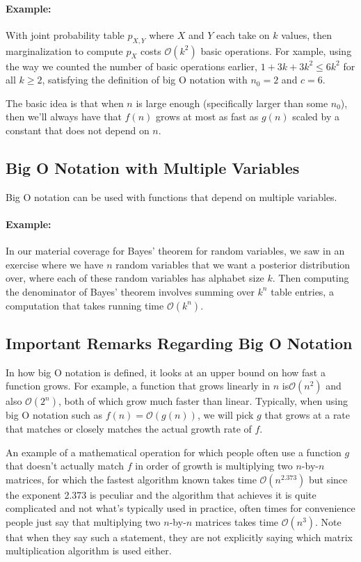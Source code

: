 \documentclass[6008notes.tex]{subfiles}
\begin{document}
\paragraph{Example:} With joint probability table $p_{X,Y}$ where $X$ and $Y$ each take on $k$ values, then marginalization to compute $p_X$ costs $\mathcal{O}(k^2)$ basic operations. For xample, using the way we counted the number of basic operations earlier, $1+3k+3k^2 \le 6k^2$ for all $k \ge 2$, satisfying the definition of big O notation with $n_0=2$ and $c=6$.

The basic idea is that when $n$ is large enough (specifically larger than some $n_0$), then we'll always have that $f(n)$ grows at most as fast as $g(n)$ scaled by a constant that does not depend on $n$.

\subsection{Big O Notation with Multiple Variables}

Big O notation can be used with functions that depend on multiple variables.

\paragraph{Example:} In our material coverage for Bayes' theorem for random variables, we saw in an exercise where we have $n$ random variables that we want a posterior distribution over, where each of these random variables has alphabet size $k$. Then computing the denominator of Bayes' theorem involves summing over $k^n$ table entries, a computation that takes running time $\mathcal{O}(k^ n)$.

\subsection{Important Remarks Regarding Big O Notation}

In how big O notation is defined, it looks at an upper bound on how fast a function grows. For example, a function that grows linearly in $n$ is$\mathcal{O}(n^2)$ and also $\mathcal{O}(2^n)$, both of which grow much faster than linear. Typically, when using big O notation such as $f(n) = \mathcal{O}(g(n))$, we will pick $g$ that grows at a rate that matches or closely matches the actual growth rate of $f$.

An example of a mathematical operation for which people often use a function $g$ that doesn't actually match $f$ in order of growth is multiplying two $n$-by-$n$ matrices, for which the fastest algorithm known takes time $\mathcal{O}(n^{2.373})$ but since the exponent 2.373 is peculiar and the algorithm that achieves it is quite complicated and not what's typically used in practice, often times for convenience people just say that multiplying two $n$-by-$n$ matrices takes time $\mathcal{O}(n^3)$. Note that when they say such a statement, they are not explicitly saying which matrix multiplication algorithm is used either.
\end{document}
